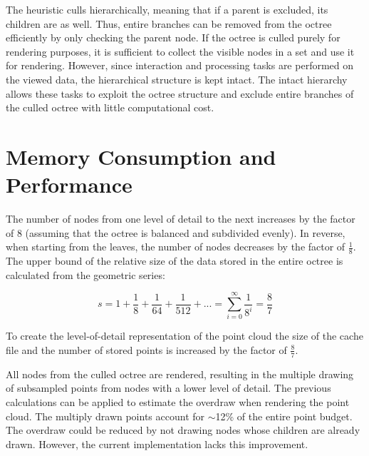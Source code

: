 \par

The heuristic culls hierarchically, meaning that if a parent is excluded, its children are as well. Thus, entire branches can be removed from the octree efficiently by only checking the parent node. If the octree is culled purely for rendering purposes, it is sufficient to collect the visible nodes in a set and use it for rendering. However, since interaction and processing tasks are performed on the viewed data, the hierarchical structure is kept intact. The intact hierarchy allows these tasks to exploit the octree structure and exclude entire branches of the culled octree with little computational cost. 


\section{Memory Consumption and Performance}
\label{sec:octree_memory}

The number of nodes from one level of detail to the next increases by the factor of $8$ (assuming that the octree is balanced and subdivided evenly). In reverse, when starting from the leaves, the number of nodes decreases by the factor of $\frac{1}{8}$. The upper bound of the relative size of the data stored in the entire octree is calculated from the geometric series: 


$$s = 1 + \frac{1}{8} + \frac{1}{64} + \frac{1}{512} + ... = \sum_{i = 0}^{\infty}{\frac{1}{8^i}} = \frac{8}{7}$$


To create the level-of-detail representation of the point cloud the size of the cache file and the number of stored points is increased by the factor of $\frac{8}{7}$. 

\par

All nodes from the culled octree are rendered, resulting in the multiple drawing of subsampled points from nodes with a lower level of detail. The previous calculations can be applied to estimate the overdraw when rendering the point cloud. The multiply drawn points account for $\sim$12\% of the entire point budget. The overdraw could be reduced by not drawing nodes whose children are already drawn. However, the current implementation lacks this improvement. 
